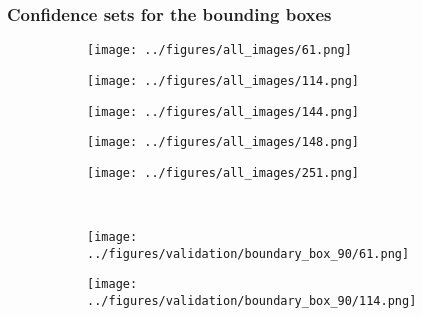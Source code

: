 \newpage
\subsubsection{Confidence sets for the bounding boxes}
\begin{figure}[h!]
		\begin{subfigure}[b]{0.03\textwidth} %
		\centering
	\end{subfigure}
	\hspace{0.05cm}
	\begin{subfigure}{0.18\textwidth}
		\centering
		\texttt{[image: ../figures/all\_images/61.png]}
		\label{fig:1}
	\end{subfigure}
	\begin{subfigure}{0.18\textwidth}
		\centering
		\texttt{[image: ../figures/all\_images/114.png]}
		\label{fig:1}
	\end{subfigure}
	\begin{subfigure}{0.18\textwidth}
		\centering
		\texttt{[image: ../figures/all\_images/144.png]}
		\label{fig:1}
	\end{subfigure}
	\begin{subfigure}{0.18\textwidth}
		\centering
		\texttt{[image: ../figures/all\_images/148.png]}
		\label{fig:1}
	\end{subfigure}
	\begin{subfigure}{0.18\textwidth}
		\centering
		\texttt{[image: ../figures/all\_images/251.png]}
		\label{fig:1}
	\end{subfigure}
	\vspace{-0.35cm}
	\\
		\begin{subfigure}[b]{0.03\textwidth} %
		\centering
	\end{subfigure}
	\hspace{0.05cm}
	\begin{subfigure}{0.18\textwidth}
		\centering
		\texttt{[image: ../figures/validation/boundary\_box\_90/61.png]}
		\label{fig:1}
	\end{subfigure}
	\begin{subfigure}{0.18\textwidth}
		\centering
		\texttt{[image: ../figures/validation/boundary\_box\_90/114.png]}
		\label{fig:1}
	\end{subfigure}

\end{figure}

